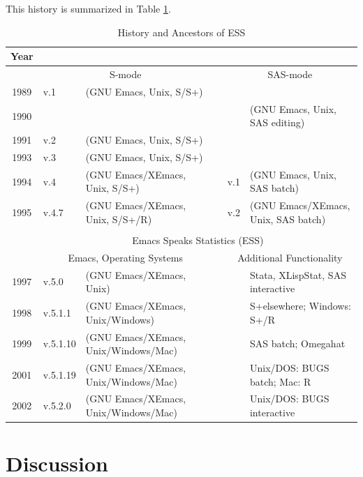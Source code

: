 \documentclass{article}
\begin{document}
This history is summarized in Table \ref{tab:timeline}.

\begin{table}[htbp]
  \centering
  {\scriptsize
  \begin{tabular}{c ll c ll}
\hline
    Year  \\
\hline
         & \multicolumn{2}{c}{S-mode}               && \multicolumn{2}{c}{SAS-mode} \\
\cline{2-3} \cline{5-6}
    1989 & v.1   & (GNU Emacs, Unix, S/S+)          &&  \\
    1990 &       &                                  &&     & (GNU Emacs, Unix, SAS editing) \\
    1991 & v.2   & (GNU Emacs, Unix, S/S+)          && \\
    1993 & v.3   & (GNU Emacs, Unix, S/S+)          && \\
    1994 & v.4   & (GNU Emacs/XEmacs, Unix, S/S+)   && v.1 & (GNU Emacs, Unix, SAS batch) \\
    1995 & v.4.7 & (GNU Emacs/XEmacs, Unix, S/S+/R) && v.2 & (GNU Emacs/XEmacs, Unix, SAS batch) \\
         &       &                                  &&     & \\ \cline{2-6}
         & \multicolumn{5}{c}{Emacs Speaks Statistics (ESS)} \\
    \cline{2-6}
         &\multicolumn{2}{c}{Emacs, Operating Systems}     &&\multicolumn{2}{c}{Additional Functionality}\\
\cline{2-3} \cline{5-6}
    1997 & v.5.0    & (GNU Emacs/XEmacs, Unix)             &&& Stata, XLispStat, SAS interactive \\
    1998 & v.5.1.1  & (GNU Emacs/XEmacs, Unix/Windows)     &&& S+elsewhere; Windows: S+/R\\
    1999 & v.5.1.10 & (GNU Emacs/XEmacs, Unix/Windows/Mac) &&& SAS batch; Omegahat \\
    2001 & v.5.1.19 & (GNU Emacs/XEmacs, Unix/Windows/Mac) &&& Unix/DOS: BUGS batch; Mac: R \\
    2002 & v.5.2.0  & (GNU Emacs/XEmacs, Unix/Windows/Mac) &&& Unix/DOS: BUGS interactive \\
    \hline
  \end{tabular}
  }
  \caption{History and Ancestors of ESS}
  \label{tab:timeline}
\end{table}

\section{Discussion}
\label{sec:concl}
\end{document}
